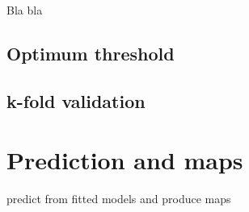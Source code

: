 \documentclass[
]{book}
\begin{document}
Bla bla

\hypertarget{optimum-threshold}{%
\section{Optimum threshold}\label{optimum-threshold}}

\hypertarget{k-fold-validation}{%
\section{k-fold validation}\label{k-fold-validation}}

\hypertarget{prediction-and-maps}{%
\chapter{Prediction and maps}\label{prediction-and-maps}}

predict from fitted models and produce maps

  
\end{document}
